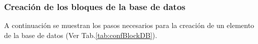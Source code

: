\subsubsection{Creación de los bloques de la base de datos}
A continuación se muestran los pasos necesarios para la creación de un elemento 
de la base de datos (Ver Tab.\ref{tab:confBlockDB}).
